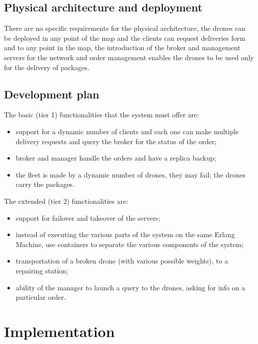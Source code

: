 \documentclass[a4paper, oneside]{memoir}
\begin{document}
\section{Physical architecture and deployment}
There are no specific requirements for the physical architecture, the drones can be deployed in any point of the map and the clients can request deliveries form and to any point in the map, the introduction of the broker and management servers for the network and order management enables the drones to be used only for the delivery of packages.


\section{Development plan}
The basic (tier 1) functionalities that the system must offer are:
\begin{itemize}
\item support for a dynamic number of clients and each one can make multiple delivery requests and query the broker for the status of the order;
\item broker and manager handle the orders and have a replica backup;
\item the fleet is made by a dynamic number of drones, they may fail; the drones carry the packages.
\end{itemize}

The extended (tier 2) functionalities are:
\begin{itemize}
\item support for failover and takeover of the servers;
\item instead of executing the various parts of the system on the same Erlang Machine, use containers to separate the various components of the system;
\item transportation of a broken drone (with various possible weights), to a repairing station;
\item ability of the manager to launch a query to the drones, asking for info on a particular order.
\end{itemize}


\chapter{Implementation}
\end{document}
